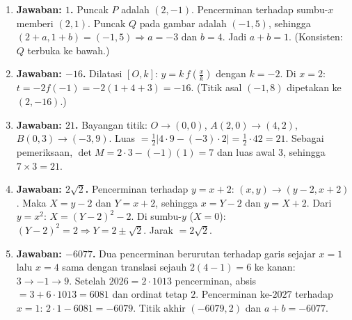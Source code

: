 \documentclass[a4paper,11pt]{article}
\newcounter{no}
\begin{document}
\small\begin{enumerate}[leftmargin=2em,itemsep=2pt,topsep=2pt]
\item[\textbf{1.}] \textbf{Jawaban: $1$.} Puncak $P$ adalah $(2,-1)$. Pencerminan terhadap sumbu-$x$ memberi $(2,1)$. Puncak $Q$ pada gambar adalah $(-1,5)$, sehingga $(2+a,1+b)=(-1,5)\Rightarrow a=-3$ dan $b=4$. Jadi $a+b=1$. (Konsisten: $Q$ terbuka ke bawah.)
\item[\textbf{2.}] \textbf{Jawaban: $-16$.} Dilatasi $[O,k]$: $y=k\,f\!\left(\frac xk\right)$ dengan $k=-2$. Di $x=2$: $t=-2f(-1)=-2(1+4+3)=-16$. (Titik asal $(-1,8)$ dipetakan ke $(2,-16)$.)
\item[\textbf{3.}] \textbf{Jawaban: $21$.} Bayangan titik: $O\to(0,0)$, $A(2,0)\to(4,2)$, $B(0,3)\to(-3,9)$. Luas $=\frac12|4\cdot9-(-3)\cdot2|=\frac12\cdot42=21$. Sebagai pemeriksaan, $\det M=2\cdot3-(-1)(1)=7$ dan luas awal $3$, sehingga $7\times3=21$.
\item[\textbf{4.}] \textbf{Jawaban: $2\sqrt2$.} Pencerminan terhadap $y=x+2$: $(x,y)\to(y-2,x+2)$. Maka $X=y-2$ dan $Y=x+2$, sehingga $x=Y-2$ dan $y=X+2$. Dari $y=x^2$: $X=(Y-2)^2-2$. Di sumbu-$y$ ($X=0$): $(Y-2)^2=2\Rightarrow Y=2\pm\sqrt2$. Jarak $=2\sqrt2$.
\item[\textbf{5.}] \textbf{Jawaban: $-6077$.} Dua pencerminan berurutan terhadap garis sejajar $x=1$ lalu $x=4$ sama dengan translasi sejauh $2(4-1)=6$ ke kanan: $3\to-1\to9$. Setelah $2026=2\cdot1013$ pencerminan, absis $=3+6\cdot1013=6081$ dan ordinat tetap $2$. Pencerminan ke-$2027$ terhadap $x=1$: $2\cdot1-6081=-6079$. Titik akhir $(-6079,2)$ dan $a+b=-6077$.
\end{enumerate}
\par{}\par\vspace{0.2em}
\end{document}

